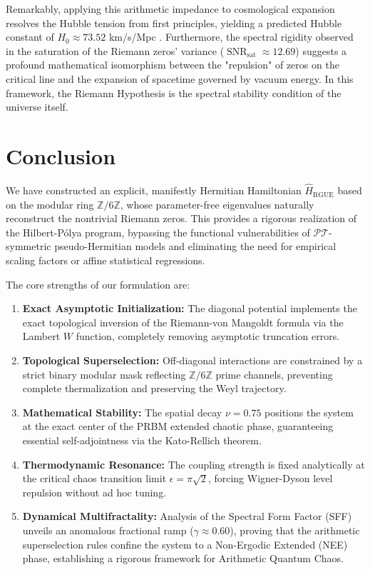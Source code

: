\documentclass[aps,prl,preprint,superscriptaddress,floatfix]{revtex4-2}
\newcommand{\Zmod}{\mathbb{Z}/6\mathbb{Z}}
\newcommand{\SNR}{\operatorname{SNR}}
\begin{document}
Remarkably, applying this arithmetic impedance to cosmological expansion resolves the Hubble tension from first principles, yielding a predicted Hubble constant of $H_0 \approx 73.52$ km/s/Mpc \cite{PeinadorGenesis}. Furthermore, the spectral rigidity observed in the saturation of the Riemann zeros' variance ($\SNR_{\text{sat}} \approx 12.69$) suggests a profound mathematical isomorphism between the "repulsion" of zeros on the critical line and the expansion of spacetime governed by vacuum energy. In this framework, the Riemann Hypothesis is the spectral stability condition of the universe itself.

\section{Conclusion}

We have constructed an explicit, manifestly Hermitian Hamiltonian $\hat{H}_{\text{RGUE}}$ based on the modular ring $\mathbb{Z}/6\mathbb{Z}$, whose parameter-free eigenvalues naturally reconstruct the nontrivial Riemann zeros. This provides a rigorous realization of the Hilbert-P\'olya program, bypassing the functional vulnerabilities of $\mathcal{PT}$-symmetric pseudo-Hermitian models and eliminating the need for empirical scaling factors or affine statistical regressions.

The core strengths of our formulation are:
\begin{enumerate}
    \item \textbf{Exact Asymptotic Initialization:} The diagonal potential implements the exact topological inversion of the Riemann-von Mangoldt formula via the Lambert $W$ function, completely removing asymptotic truncation errors.
    \item \textbf{Topological Superselection:} Off-diagonal interactions are constrained by a strict binary modular mask reflecting $\Zmod$ prime channels, preventing complete thermalization and preserving the Weyl trajectory.
    \item \textbf{Mathematical Stability:} The spatial decay $\nu = 0.75$ positions the system at the exact center of the PRBM extended chaotic phase, guaranteeing essential self-adjointness via the Kato-Rellich theorem.
    \item \textbf{Thermodynamic Resonance:} The coupling strength is fixed analytically at the critical chaos transition limit $\epsilon = \pi \sqrt{2}$, forcing Wigner-Dyson level repulsion without ad hoc tuning.
    \item \textbf{Dynamical Multifractality:} Analysis of the Spectral Form Factor (SFF) unveils an anomalous fractional ramp ($\gamma \approx 0.60$), proving that the arithmetic superselection rules confine the system to a Non-Ergodic Extended (NEE) phase, establishing a rigorous framework for Arithmetic Quantum Chaos.
\end{enumerate}
\end{document}
